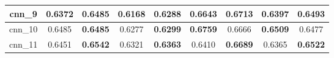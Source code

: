 \begin{table}[p]
\begin{tabular}{|c|c|c|c|c|c|c|c|c|}
        cnn\_9   & 0.6372                              & \textbf{0.6485}                     & 0.6168                              & \textbf{0.6288}                     & 0.6643                              & \textbf{0.6713}                     & 0.6397                              & \textbf{0.6493}                     \\ \hline
        cnn\_10  & 0.6485                              & \textbf{0.6485}                     & 0.6277                              & \textbf{0.6299}                     & \textbf{0.6759}                     & 0.6666                              & \textbf{0.6509}                     & 0.6477                              \\ \hline
        cnn\_11  & 0.6451                              & \textbf{0.6542}                     & 0.6321                              & \textbf{0.6363}                     & 0.6410                              & \textbf{0.6689}                     & 0.6365                              & \textbf{0.6522}                     \\ \hline
    \end{tabular}
\end{table}



